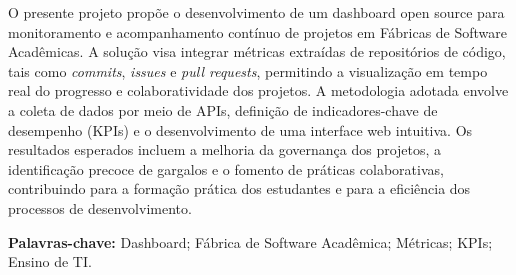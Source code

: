 \documentclass[
	12pt,           %
	openright,      %
	oneside,        %
	a4paper,        %
	brazil          %
]{abntex2}
\begin{document}

\frenchspacing 



\imprimirfolhaderosto


\begin{resumo}
	O presente projeto propõe o desenvolvimento de um dashboard open source para monitoramento e acompanhamento contínuo de projetos em Fábricas de Software Acadêmicas. A solução visa integrar métricas extraídas de repositórios de código, tais como \emph{commits}, \emph{issues} e \emph{pull requests}, permitindo a visualização em tempo real do progresso e colaboratividade dos projetos. A metodologia adotada envolve a coleta de dados por meio de APIs, definição de indicadores-chave de desempenho (KPIs) e o desenvolvimento de uma interface web intuitiva. Os resultados esperados incluem a melhoria da governança dos projetos, a identificação precoce de gargalos e o fomento de práticas colaborativas, contribuindo para a formação prática dos estudantes e para a eficiência dos processos de desenvolvimento. 

	\textbf{Palavras-chave:} Dashboard; Fábrica de Software Acadêmica; Métricas; KPIs; Ensino de TI.
\end{resumo}

       
\end{document}
